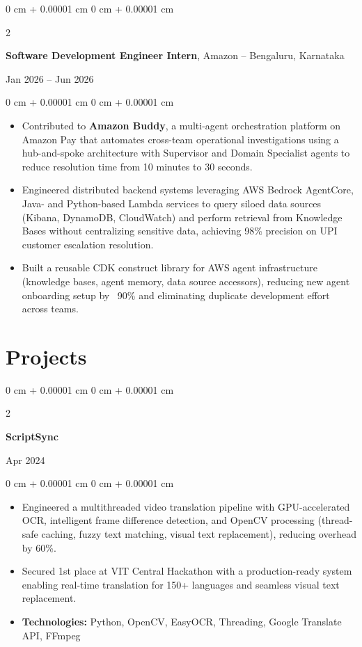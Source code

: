 \documentclass[10pt, letterpaper]{article}
\newenvironment{highlights}{
    \begin{itemize}[
        topsep=0.10 cm,
        parsep=0.10 cm,
        partopsep=0pt,
        itemsep=0pt,
        leftmargin=0 cm + 10pt
    ]
}{
    \end{itemize}
}
\newenvironment{onecolentry}{
    \begin{adjustwidth}{
        0 cm + 0.00001 cm
    }{
        0 cm + 0.00001 cm
    }
}{
    \end{adjustwidth}
}
\newenvironment{twocolentry}[2][]{
    \onecolentry
    \def\secondColumn{#2}
    \setcolumnwidth{\fill, 4.5 cm}
    \begin{paracol}{2}
}{
    \switchcolumn \raggedleft \secondColumn
    \end{paracol}
    \endonecolentry
}
\begin{document}
    \begin{twocolentry}{Jan 2026 -- Jun 2026}
    \textbf{Software Development Engineer Intern}, Amazon -- Bengaluru, Karnataka
    \end{twocolentry}
    \vspace{0.20 cm}
    \begin{onecolentry}
    \begin{highlights}
    \item Contributed to \textbf{Amazon Buddy}, a multi-agent orchestration platform on Amazon Pay that automates cross-team operational investigations using a hub-and-spoke architecture with Supervisor and Domain Specialist agents to reduce resolution time from 10 minutes to 30 seconds.
    \item Engineered distributed backend systems leveraging AWS Bedrock AgentCore, Java- and Python-based Lambda services to query siloed data sources (Kibana, DynamoDB, CloudWatch) and perform retrieval from Knowledge Bases without centralizing sensitive data, achieving 98\% precision on UPI customer escalation resolution.
    \item Built a reusable CDK construct library for AWS agent infrastructure (knowledge bases, agent memory, data source accessors), reducing new agent onboarding setup by ~90\% and eliminating duplicate development effort across teams.
    \end{highlights}
    \vspace{0.10 cm}
    \end{onecolentry}

\section{Projects}


\begin{twocolentry}{
            Apr 2024
        }
            \textbf{ScriptSync}
        \end{twocolentry}

        \vspace{0.10 cm}
        \begin{onecolentry}
            \begin{highlights}
\item Engineered a multithreaded video translation pipeline with GPU-accelerated OCR, intelligent frame difference detection, and OpenCV processing (thread-safe caching, fuzzy text matching, visual text replacement), reducing overhead by 60\%.
\item Secured 1st place at VIT Central Hackathon with a production-ready system enabling real-time translation for 150+ languages and seamless visual text replacement.
                \item \textbf{Technologies:} Python, OpenCV, EasyOCR, Threading, Google Translate API, FFmpeg
            \end{highlights}
        \end{onecolentry}
\end{document}
